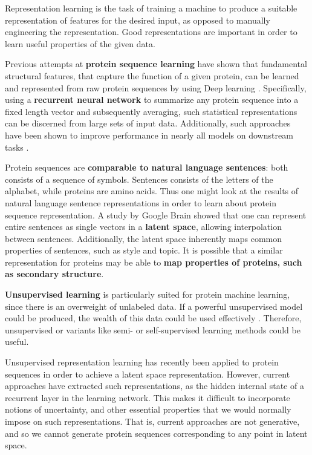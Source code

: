 \documentclass[a4paper,11pt]{article}
\begin{document}
Representation learning is the task of training a machine to produce a suitable representation of features for the desired input, as opposed to manually engineering the representation. Good representations are important in order to learn useful properties of the given data.

Previous attempts at \textbf{protein sequence learning} have shown that fundamental structural features, that capture the function of a given protein, can be learned and represented from raw protein sequences by using Deep learning \cite{alley2019unified}. Specifically, using a \textbf{recurrent neural network} to summarize any protein sequence into a fixed length vector and subsequently averaging, such statistical representations can be discerned from large sets of input data. Additionally, such approaches have been shown to improve performance in nearly all models on downstream tasks \cite{rao2019evaluating}.

Protein sequences are \textbf{comparable to natural language sentences}: both consists of a sequence of symbols. Sentences consists of the letters of the alphabet, while proteins are amino acids. Thus one might look at the results of natural language sentence representations in order to learn about protein sequence representation. A study by Google Brain \cite{bowman2015generating} showed that one can represent entire sentences as single vectors in a \textbf{latent space}, allowing interpolation between sentences. Additionally, the latent space inherently maps common properties of sentences, such as style and topic. It is possible that a similar representation for proteins may be able to \textbf{map properties of proteins, such as secondary structure}.

\textbf{Unsupervised learning} is particularly suited for protein machine learning, since there is an overweight of unlabeled data. If a powerful unsupervised model could be produced, the wealth of this data could be used effectively \cite{AlQuraishiUnsupervised}. Therefore, unsupervised or variants like semi- or self-supervised learning methods could be useful.

Unsupervised representation learning has recently been applied to protein sequences \cite{alley2019unified} in order to achieve a latent space representation. However, current approaches have extracted such representations, as the hidden internal state of a recurrent layer in the learning network. This makes it difficult to incorporate notions of uncertainty, and other essential properties that we would normally impose on such representations. That is, current approaches are not generative, and so we cannot generate protein sequences corresponding to any point in latent space.
\end{document}
